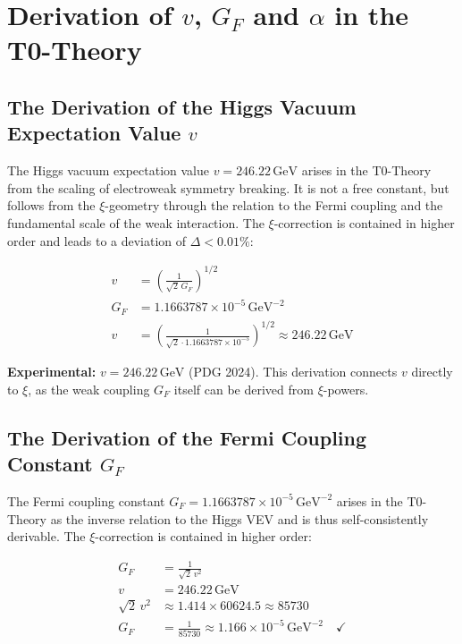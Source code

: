 	\section{Derivation of $v$, $G_F$ and $\alpha$ in the T0-Theory}
	\subsection{The Derivation of the Higgs Vacuum Expectation Value $v$}
	The Higgs vacuum expectation value $v = 246.22\,\si{\giga\electronvolt}$ arises in the T0-Theory from the scaling of electroweak symmetry breaking. It is not a free constant, but follows from the $\xi$-geometry through the relation to the Fermi coupling and the fundamental scale of the weak interaction. The $\xi$-correction is contained in higher order and leads to a deviation of $\Delta < 0.01\%$:
	
	\begin{align}
		v &= \left( \frac{1}{\sqrt{2} \, G_F} \right)^{1/2} \\
		G_F &= 1.1663787 \times 10^{-5} \,\si{\giga\electronvolt\tothe{-2}} \\
		v &= \left( \frac{1}{\sqrt{2} \cdot 1.1663787 \times 10^{-5}} \right)^{1/2} \approx 246.22 \,\si{\giga\electronvolt}
	\end{align}
	
	\textbf{Experimental:} $v = 246.22\,\si{\giga\electronvolt}$ (PDG 2024). This derivation connects $v$ directly to $\xi$, as the weak coupling $G_F$ itself can be derived from $\xi$-powers.
	\subsection{The Derivation of the Fermi Coupling Constant $G_F$}
	The Fermi coupling constant $G_F = 1.1663787 \times 10^{-5} \,\si{\giga\electronvolt\tothe{-2}}$ arises in the T0-Theory as the inverse relation to the Higgs VEV and is thus self-consistently derivable. The $\xi$-correction is contained in higher order:
	
	\begin{align}
		G_F &= \frac{1}{\sqrt{2} \, v^2} \\
		v &= 246.22 \,\si{\giga\electronvolt} \\
		\sqrt{2} \, v^2 &\approx 1.414 \times 60624.5 \approx 85730 \\
		G_F &= \frac{1}{85730} \approx 1.166 \times 10^{-5} \,\si{\giga\electronvolt\tothe{-2}} \quad \checkmark
	\end{align}
	
